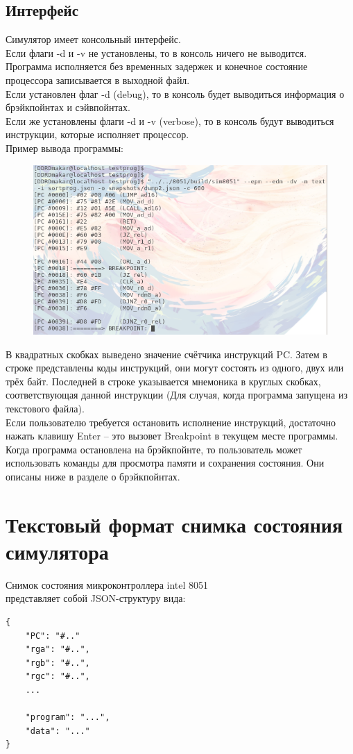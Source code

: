 \subsection{Интерфейс}
Симулятор имеет консольный интерфейс. \\
Если флаги -d и -v не установлены, то в консоль ничего не  выводится. Программа исполняется без временных задержек и конечное состояние процессора записывается в выходной файл. \\
Если установлен флаг -d (debug), то в консоль будет выводиться информация о брэйкпойнтах и сэйвпойнтах. \\
Если же установлены флаги -d и -v (verbose), то в консоль будут выводиться инструкции, которые исполняет процессор. \\
\newpage
Пример вывода программы:
\begin{figure}[H]
	\centering
	\includegraphics[width=0.8\linewidth]{img/interface}
	\caption{}
\end{figure}
В квадратных скобках выведено значение счётчика инструкций PC. Затем в строке представлены коды инструкций, они могут состоять из одного, двух или трёх байт. Последней в строке указывается мнемоника в круглых скобках, соответствующая данной инструкции (Для случая, когда программа запущена из текстового файла). \\
Если пользователю требуется остановить исполнение инструкций, достаточно нажать клавишу Enter -- это вызовет Breakpoint в текущем месте программы. \\
Когда программа остановлена на брэйкпойнте, то пользователь может использовать команды для просмотра памяти и сохранения состояния. Они описаны ниже в разделе о брэйкпойнтах.


\section{Текстовый формат снимка состояния симулятора}
Снимок состояния микроконтроллера intel 8051 \\ представляет собой JSON-структуру вида:\\
\begin{lstlisting}
{
	"PC": "#.."
	"rga": "#..",
	"rgb": "#..",
	"rgc": "#..",
	...
	
	"program": "...",
	"data": "..."
}
\end{lstlisting}

